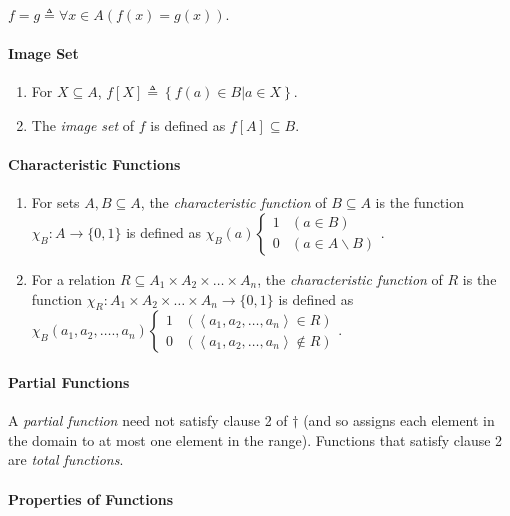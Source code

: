 \documentclass[10pt,twoside,twocolumn]{article}
\begin{document}
$f=g\triangleq\forall x\in A\left(f\left(x\right)=g\left(x\right)\right)$.


\paragraph{Image Set}
\begin{enumerate}
\item For $X\subseteq A$, $f\left[X\right]\triangleq\left\{ f\left(a\right)\in B|a\in X\right\} $.
\item The \emph{image set} of $f$ is defined as $f\left[A\right]\subseteq B$.
\end{enumerate}

\paragraph{Characteristic Functions}
\begin{enumerate}
\item For sets $A,B\subseteq A$, the \emph{characteristic function} of
$B\subseteq A$ is the function $\chi_{B}:A\rightarrow\{0,1\}$ is
defined as $\chi_{B}\left(a\right)\begin{cases}
1 & \left(a\in B\right)\\
0 & \left(a\in A\backslash B\right)
\end{cases}$.
\item For a relation $R\subseteq A_{1}\times A_{2}\times\dots\times A_{n}$,
the \emph{characteristic function} of $R$ is the function $\chi_{R}:A_{1}\times A_{2}\times\dots\times A_{n}\rightarrow\{0,1\}$
is defined as $\chi_{B}\left(a_{1},a_{2},\dots.,a_{n}\right)\begin{cases}
1 & \left(\left\langle a_{1},a_{2},\dots,a_{n}\right\rangle \in R\right)\\
0 & \left(\left\langle a_{1},a_{2},\dots,a_{n}\right\rangle \notin R\right)
\end{cases}$.
\end{enumerate}

\paragraph{Partial Functions}

A \emph{partial function} need not satisfy clause 2 of $\dagger$
(and so assigns each element in the domain to at most one element
in the range). Functions that satisfy clause 2 are \emph{total functions}.


\paragraph{Properties of Functions}
\end{document}

